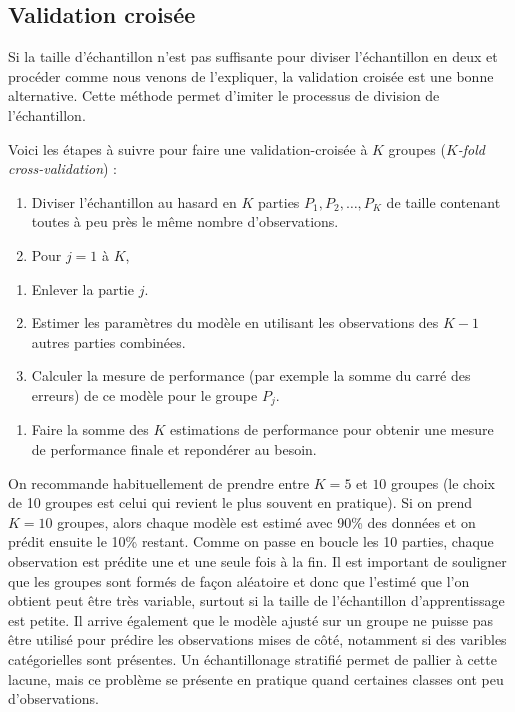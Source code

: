 \documentclass[
]{book}
\providecommand{\tightlist}{%
  \setlength{\itemsep}{0pt}\setlength{\parskip}{0pt}}
\theoremstyle{definition}
\theoremstyle{definition}
\theoremstyle{definition}
\theoremstyle{remark}
\begin{document}
\hypertarget{validation-croisuxe9e}{%
\subsection{Validation croisée}\label{validation-croisuxe9e}}

Si la taille d'échantillon n'est pas suffisante pour diviser l'échantillon en deux et procéder comme nous venons de l'expliquer, la validation croisée est une bonne alternative. Cette méthode permet d'imiter le processus de division de l'échantillon.

Voici les étapes à suivre pour faire une validation-croisée à \(K\) groupes (\emph{\(K\)-fold cross-validation}) :

\begin{enumerate}
\def\labelenumi{\arabic{enumi}.}
\tightlist
\item
  Diviser l'échantillon au hasard en \(K\) parties \(P_1, P_2, \ldots, P_K\) de taille contenant toutes à peu près le même nombre d'observations.
\item
  Pour \(j = 1\) à \(K\),
\end{enumerate}

\begin{enumerate}
\def\labelenumi{\roman{enumi}.}
\tightlist
\item
  Enlever la partie \(j\).
\item
  Estimer les paramètres du modèle en utilisant les observations des \(K-1\) autres parties combinées.
\item
  Calculer la mesure de performance (par exemple la somme du carré des erreurs) de ce modèle pour le groupe \(P_j\).
\end{enumerate}

\begin{enumerate}
\def\labelenumi{\arabic{enumi}.}
\setcounter{enumi}{2}
\tightlist
\item
  Faire la somme des \(K\) estimations de performance pour obtenir une mesure de performance finale et repondérer au besoin.
\end{enumerate}

On recommande habituellement de prendre entre \(K=5\) et \(10\) groupes (le choix de 10 groupes est celui qui revient le plus souvent en pratique). Si on prend \(K=10\) groupes, alors chaque modèle est estimé avec 90\% des données et on prédit ensuite le 10\% restant. Comme on passe en boucle les 10 parties, chaque observation est prédite une et une seule fois à la fin. Il est important de souligner que les groupes sont formés de façon aléatoire et donc que l'estimé que l'on obtient peut être très variable, surtout si la taille de l'échantillon d'apprentissage est petite. Il arrive également que le modèle ajusté sur un groupe ne puisse pas être utilisé pour prédire les observations mises de côté, notamment si des varibles catégorielles sont présentes. Un échantillonage stratifié permet de pallier à cette lacune, mais ce problème se présente en pratique quand certaines classes ont peu d'observations.
\end{document}
